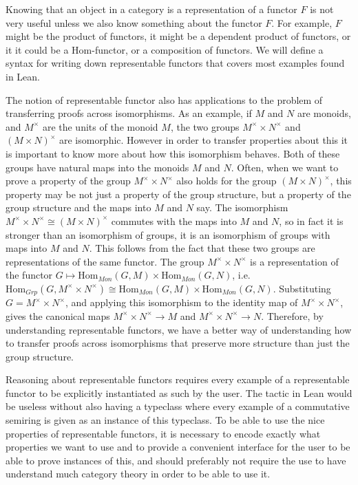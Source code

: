 \documentclass[12pt]{article} %
\theoremstyle{definition}
\theoremstyle{definition}
\theoremstyle{definition}
\theoremstyle{definition}
\begin{document}
Knowing that an object in a category is a representation of a functor $F$ is not very useful unless we also know
something about the functor $F$. For example, $F$ might be the product of functors, it might be a dependent
product of functors, or it it could be a Hom-functor, or a composition of functors. We will define
a syntax for writing down representable functors that covers most examples found in Lean.

The notion of representable functor also has applications to the problem of transferring proofs across isomorphisms.
As an example, if $M$ and $N$ are monoids, and $M^{\times}$ are the units of the monoid $M$, the two groups $M^{\times} \times N^{\times}$
and $(M \times N)^{\times}$ are isomorphic. However in order to transfer properties about this it is important to know
more about how this isomorphism behaves. Both of these groups have natural maps into the monoids $M$ and $N$.
Often, when we want to prove a property of the group $M^{\times} \times N^{\times}$ also holds for the group
$(M \times N)^{\times}$, this property may be not just a property of the group structure, but a property of the group structure
and the maps into $M$ and $N$ say. The isomorphism $M^{\times} \times N^{\times} \cong (M \times N)^{\times}$ commutes with the maps
into $M$ and $N$, so in fact it is stronger than an isomorphism of groups, it is an isomorphism of groups with maps into $M$ and $N$.
This follows from the fact that these two groups are representations of the same functor. The group $M^{\times} \times N^{\times}$
is a representation of the functor $G \mapsto \text{Hom}_{Mon}(G, M) \times \text{Hom}_{Mon}(G, N)$, i.e.
$\text{Hom}_{Grp}(G, M^{\times} \times N^{\times}) \cong \text{Hom}_{Mon}(G, M) \times \text{Hom}_{Mon}(G, N)$.
Substituting $G=M^{\times} \times N^{\times}$, and applying this isomorphism to the identity map of $M^{\times} \times N^{\times}$,
gives the canonical maps $M^{\times} \times N^{\times} \to M$ and $M^{\times} \times N^{\times} \to N$. Therefore, by understanding
representable functors, we have a better way of understanding how to transfer proofs across isomorphisms that preserve more structure
than just the group structure.


Reasoning about representable functors requires every example of a representable functor to be explicitly
instantiated as such by the user. The  tactic in Lean would be useless without
also having a  typeclass where every example of a commutative semiring is
given as an instance of this typeclass. To be able to use the nice properties of representable functors,
it is necessary to encode exactly what properties we want to use and to provide a convenient interface for
the user to be able to prove instances of this, and should preferably not require the use to have understand
much category theory in order to be able to use it.
\end{document}
